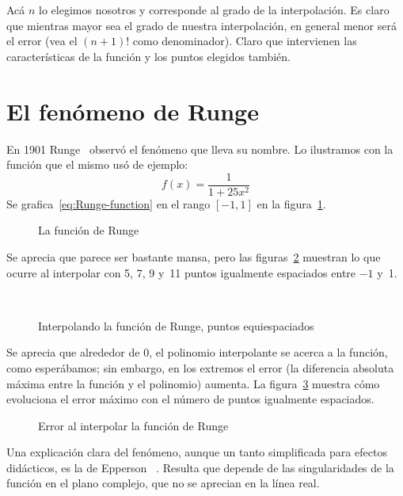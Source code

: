   Acá \(n\) lo elegimos nosotros
  y corresponde al grado de la interpolación.
  Es claro que mientras mayor sea el grado de nuestra interpolación,
  en general menor será el error
  (vea el \((n + 1)!\) como denominador).
  Claro que intervienen las características de la función
  y los puntos elegidos también.

\section{El fenómeno de Runge}
\label{sec:Runge-phenomenon}

  En 1901 Runge~%
    \cite{runge01:_ueber_aequidistante_interpolation}
  observó el fenómeno que lleva su nombre.
  Lo ilustramos con la función que el mismo usó de ejemplo:
  \begin{equation}
    \label{eq:Runge-function}
    f(x)
      = \frac{1}{1 + 25 x^2}
  \end{equation}
  Se grafica~\eqref{eq:Runge-function}
  en el rango \([-1, 1]\) en la figura~\ref{fig:Runge-function}.
  \begin{figure}[ht]
    \centering
    \caption{La función de Runge}
    \label{fig:Runge-function}
  \end{figure}
  Se aprecia que parece ser bastante mansa,
  pero las figuras~\ref{fig:Runge-function-equiespaciados}
  muestran lo que ocurre al interpolar
  con 5, 7, 9 y~11 puntos igualmente espaciados
  entre \(-1\) y~\num{1}.
  \begin{figure}[ht]
    \centering
     \\
    \caption{Interpolando la función de Runge, puntos equiespaciados}
    \label{fig:Runge-function-equiespaciados}
  \end{figure}
  Se aprecia que alrededor de \num{0},
  el polinomio interpolante se acerca a la función,
  como esperábamos;
  sin embargo,
  en los extremos el error
  (la diferencia absoluta máxima entre la función y el polinomio)
  aumenta.
  La figura~\ref{fig:Ruge-error} muestra cómo evoluciona el error máximo
  con el número de puntos igualmente espaciados.
  \begin{figure}[ht]
    \centering
    \caption{Error al interpolar la función de Runge}
    \label{fig:Ruge-error}
  \end{figure}
  Una explicación clara del fenómeno,
  aunque un tanto simplificada para efectos didácticos,
  es la de Epperson~%
    \cite{epperson87:_runge_example}.
  Resulta que depende de las singularidades de la función
  en el plano complejo,
  que no se aprecian en la línea real.

